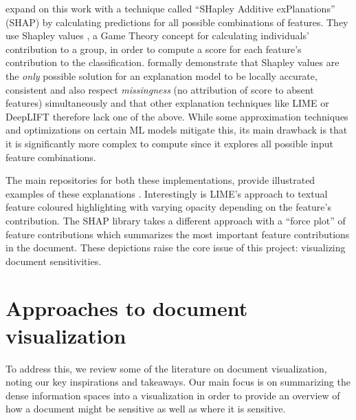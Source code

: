 \documentclass[\version]{l4proj}
\begin{document}
\textcite{lundbergUnifiedApproachInterpreting2017} expand on this work with a technique called ``SHapley Additive exPlanations'' (SHAP) by calculating predictions for all possible combinations of features.
They use Shapley values \autocite{shapleyNotesNPersonGame1951}, a Game Theory concept for calculating individuals' contribution to a group, in order to compute a score for each feature's contribution to the classification.
\textcite{lundbergUnifiedApproachInterpreting2017} formally demonstrate that Shapley values are the \textit{only} possible solution for an explanation model to be locally accurate, consistent and also respect \textit{missingness} (no attribution of score to absent features) simultaneously and that other explanation techniques like LIME or DeepLIFT therefore lack one of the above.
While some approximation techniques and optimizations on certain ML models mitigate this, its main drawback is that it is significantly more complex to compute since it explores all possible input feature combinations.

The main repositories for both these implementations, provide illustrated examples of these explanations \autocite{lundbergSlundbergShap2020,ribeiroMarcotcrLime2020}.
Interestingly is LIME's approach to textual feature coloured highlighting with varying opacity depending on the feature's contribution.
The SHAP library takes a different approach with a ``force plot'' of feature contributions which summarizes the most important feature contributions in the document.
These depictions raise the core issue of this project: visualizing document sensitivities.

\section{Approaches to document visualization}

To address this, we review some of the literature on document visualization, noting our key inspirations and takeaways.
Our main focus is on summarizing the dense information spaces into a visualization in order to provide an overview of how a document might be sensitive as well as where it is sensitive.

\pagebreak
\end{document}

